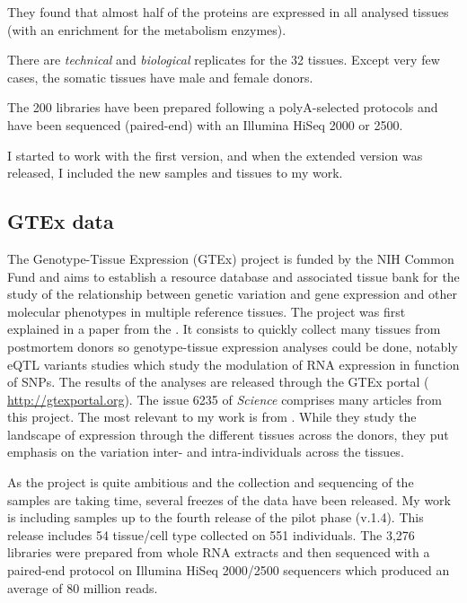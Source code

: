 They found that almost half of the proteins are expressed in all analysed tissues
(with an enrichment for the metabolism enzymes).

There are \emph{technical} and \emph{biological} replicates for the 32 tissues.
Except very few cases, the somatic tissues have male and female donors.

The 200 libraries have been prepared following a polyA-selected protocols and
have been sequenced (paired-end) with an Illumina HiSeq 2000 or 2500.

I started to work with the first version, and when the extended version was
released, I included the new samples and tissues to my work.

\subsection{GTEx data}

The Genotype-Tissue Expression (\gls{GTEx}) project is funded by the NIH Common
Fund and aims to establish a resource database and associated tissue bank
for the study of the relationship between genetic variation and gene expression
and other molecular phenotypes in multiple reference tissues. The project was first
explained in a paper from the \cite{GTEx2013}. It consists to quickly collect
many tissues from postmortem donors so genotype-tissue expression analyses could
be done, notably \gls{eQTL} variants studies which study the modulation
of \gls{RNA} expression in function of \glspl{SNP}. The results of the
analyses are released through the GTEx portal (%
\href{http://gtexportal.org}{http://gtexportal.org}). The issue 6235 of
\emph{Science} comprises
many articles from this project. The most relevant to my work is
 from \cite{GTExTranscript}. While they study
the landscape of expression through the different tissues across the donors, they
put emphasis on the variation inter- and intra-individuals across the tissues.

As the project is quite ambitious and the collection and sequencing of the samples
are taking time, several freezes of the data have been released. My work is
including samples up to the fourth release of the pilot phase (v.1.4). This
release includes 54 tissue/cell type collected on 551 individuals.
The 3,276 libraries were prepared from whole \gls{RNA} extracts and then sequenced
with a paired-end protocol on Illumina HiSeq 2000/2500 sequencers which produced
an average of 80 million reads.


